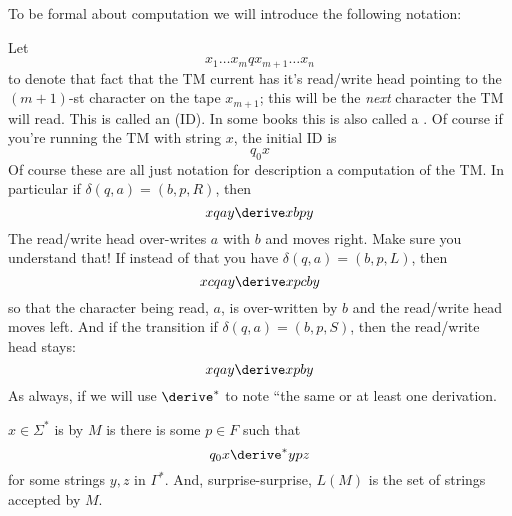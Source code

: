 To be formal about computation we will introduce the following
notation:

\begin{defn}
Let
\[
 x_1 \ldots x_m q x_{m+1} \ldots x_n
\]
to denote that fact that the TM current has it's read/write head
pointing to the $(m+1)$-st character on the tape $x_{m+1}$; this
will be the {\it next} character the TM will read. This is called
an  (ID). In some books this is
also called a . Of course if you're running
the TM with string $x$, the initial ID is
\[
q_0 x
\]
Of course these are all just notation for description a computation
of the TM. In particular if $\delta(q,a) = (b,p,R)$, then
\[
 x q a y \derive xb p y
\]
The read/write head over-writes $a$ with $b$ and moves right. Make
sure you understand that! If instead of that you have $\delta(q,a) =
(b,p,L)$, then
\[
 x c q a y \derive x p c b y
\]
so that the character being read, $a$, is over-written by $b$ and
the read/write head moves left. And if the transition if
$\delta(q,a) = (b,p,S)$, then the read/write head stays:
\[
 x q a y \derive x p b y
\]
As always, if we will use $\derive^*$ to note ``the same or at
least one derivation.
\end{defn}

\begin{defn}
$x \in \Sigma^*$ is  by $M$ is there is some $p
\in F$ such that
\[
 q_0 x \derive^* ypz
\]
for some strings $y,z$ in $\Gamma^*$. And, surprise-surprise, $L(M)$
is the set of strings accepted by $M$.
\end{defn}

